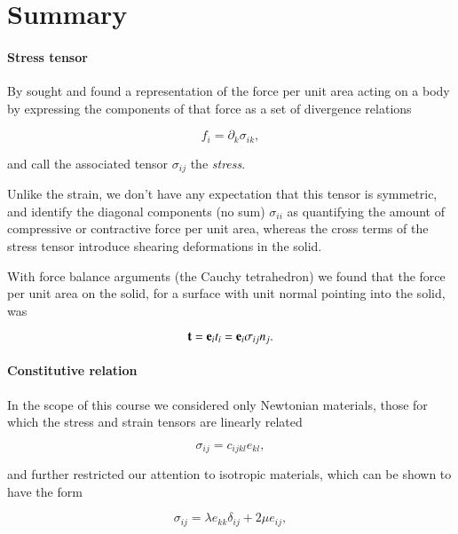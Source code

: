 \section{Summary}
\paragraph{Stress tensor}

By sought and found a representation of the force per unit area acting on a body by expressing the components of that force as a set of divergence relations

\begin{equation}\label{eqn:continuumElasticityReview:250}
f_i = \partial_k \sigma_{i k},
\end{equation}

and call the associated tensor $\sigma_{ij}$ the \textit{stress}.

Unlike the strain, we don't have any expectation that this tensor is symmetric, and identify the diagonal components (no sum) $\sigma_{i i}$ as quantifying the amount of compressive or contractive force per unit area, whereas the cross terms of the stress tensor introduce shearing deformations in the solid.

With force balance arguments (the Cauchy tetrahedron) we found that the force per unit area on the solid, for a surface with unit normal pointing into the solid, was

\begin{equation}\label{eqn:continuumElasticityReview:270}
\mathbf{t} = \mathbf{e}_i t_i = \mathbf{e}_i \sigma_{ij} n_j.
\end{equation}

\paragraph{Constitutive relation}

In the scope of this course we considered only Newtonian materials, those for which the stress and strain tensors are linearly related

\begin{equation}\label{eqn:continuumElasticityReview:290}
\sigma_{ij} = c_{ijkl} e_{kl},
\end{equation}

and further restricted our attention to isotropic materials, which can be shown to have the form

\begin{equation}\label{eqn:continuumElasticityReview:310}
\sigma_{ij} = \lambda e_{kk} \delta_{ij} + 2 \mu e_{ij},
\end{equation}

